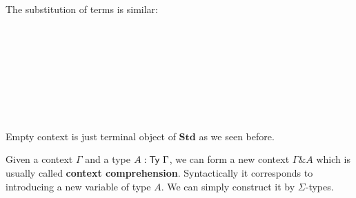 The substitution of terms is similar:

\begin{code}\>\<%
\\
\> \AgdaSymbol{:}  \AgdaSymbol{\{}  \AgdaSymbol{:} \AgdaSymbol{\}\{} \AgdaSymbol{:}  \AgdaSymbol{\}}    \<[39]%
\>[39]\<%
\\
\>[0]\<[6]%
\>[6] \AgdaSymbol{(} \AgdaSymbol{:}   \AgdaSymbol{)}   \AgdaSymbol{(} \AgdaFunction{[}  \AgdaFunction{]T}\AgdaSymbol{)}\<%
\\
\>   \AgdaSymbol{=}  \<[19]%
\>[19]\<%
\\
\>[0]\<[10]%
\>[10]\AgdaSymbol{\{}  \AgdaSymbol{=} \AgdaFunction{[}  \AgdaFunction{]tm}  \AgdaFunction{[}  \AgdaFunction{]fn}\<%
\\
\>[0]\<[10]%
\>[10]\AgdaSymbol{;}  \AgdaSymbol{=} \AgdaFunction{[}  \AgdaFunction{]respt}  \AgdaFunction{[}  \AgdaFunction{]resp} \<[43]%
\>[43]\<%
\\
\>[0]\<[10]%
\>[10]\AgdaSymbol{\}}\<%
\\
\>\<\end{code}

Empty context is just terminal object of $\textbf{Std}$ as we seen before.

Given a context $\Gamma$ and a type $A : \mathsf{Ty} ~\Gamma$, we can form a new context $\Gamma \& A$ which is usually called \textbf{context comprehension}. Syntactically it corresponds to introducing a new variable of type $A$. We can simply construct it by $\Sigma$-types.

